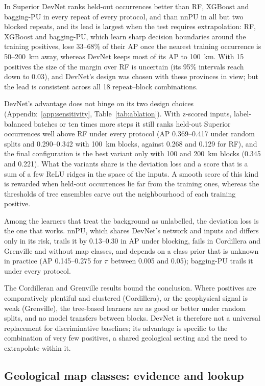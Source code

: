\documentclass[pdflatex,sn-apa]{sn-jnl}
\begin{document}
In Superior DevNet ranks held-out occurrences better than RF, XGBoost and bagging-PU in every repeat of every protocol, and than nnPU in all but two blocked repeats, and its lead is largest when the test requires extrapolation: RF, XGBoost and bagging-PU, which learn sharp decision boundaries around the training positives, lose 33--68\% of their AP once the nearest training occurrence is 50--200~km away, whereas DevNet keeps most of its AP to 100~km. With 15 positives the size of the margin over RF is uncertain (its 95\% intervals reach down to 0.03), and DevNet's design was chosen with these provinces in view; but the lead is consistent across all 18 repeat--block combinations.

DevNet's advantage does not hinge on its two design choices (Appendix~\ref{app:sensitivity}, Table~\ref{tab:ablation}). With z-scored inputs, label-balanced batches or ten times more steps it still ranks held-out Superior occurrences well above RF under every protocol (AP 0.369--0.417 under random splits and 0.290--0.342 with 100~km blocks, against 0.268 and 0.129 for RF), and the final configuration is the best variant only with 100 and 200~km blocks (0.345 and 0.221). What the variants share is the deviation loss and a score that is a sum of a few ReLU ridges in the space of the inputs. A smooth score of this kind is rewarded when held-out occurrences lie far from the training ones, whereas the thresholds of tree ensembles carve out the neighbourhood of each training positive.

Among the learners that treat the background as unlabelled, the deviation loss is the one that works. nnPU, which shares DevNet's network and inputs and differs only in its risk, trails it by 0.13--0.30 in AP under blocking, fails in Cordillera and Grenville and without map classes, and depends on a class prior that is unknown in practice (AP 0.145--0.275 for $\pi$ between 0.005 and 0.05); bagging-PU trails it under every protocol.

The Cordilleran and Grenville results bound the conclusion. Where positives are comparatively plentiful and clustered (Cordillera), or the geophysical signal is weak (Grenville), the tree-based learners are as good or better under random splits, and no model transfers between blocks. DevNet is therefore not a universal replacement for discriminative baselines; its advantage is specific to the combination of very few positives, a shared geological setting and the need to extrapolate within it.

\subsection{Geological map classes: evidence and lookup}\label{sec:disc-mapclasses}
\end{document}

